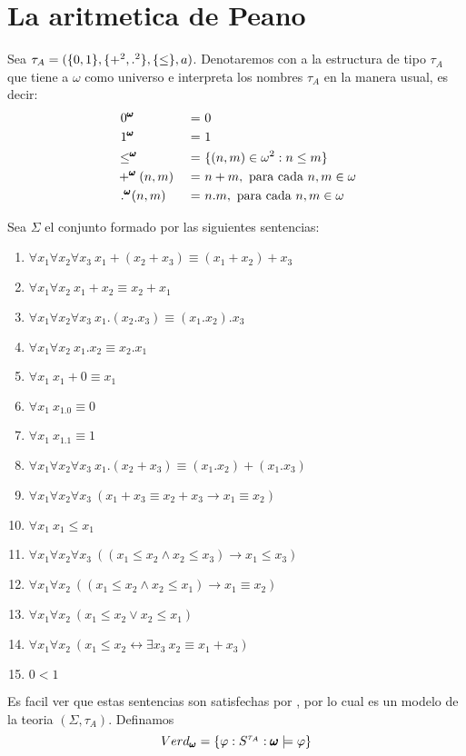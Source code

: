 


\section{La aritmetica de Peano}

\begin{definition}
  Sea $\tau_A = (\{0,1\},\{+^2,.^2\},\{\leq\},a)$. Denotaremos con \pomega a la estructura de tipo $\tau_A$
  que tiene a $\omega$ como universo e interpreta los nombres $\tau_A$ en la manera usual, es decir:
  \begin{alignat*}{4}
    &\ 0^{\pmb{\omega}} &\ =&\ 0\\
    &\ 1^{\pmb{\omega}} &\ =&\ 1\\
    &\leq^{\pmb{\omega}} &\ =&\ \{(n,m)\in \omega^2: n\leq m\}\\
    &+^{\pmb{\omega}}(n,m) &\ =&\ n+m, \text{ para cada } n,m\in\omega\\
    &\ .^{\pmb{\omega}}(n,m) &\ =&\ n.m, \text{ para cada } n,m\in\omega
  \end{alignat*}

  Sea $\Sigma$ el conjunto formado por las siguientes sentencias:\begin{enumerate}
    \item $\forall x_1 \forall x_2 \forall x_3\ x_1+(x_2+x_3)\equiv(x_1+x_2)+x_3$
    \item $\forall x_1 \forall x_2\ x_1+x_2\equiv x_2+x_1$
    \item $\forall x_1 \forall x_2 \forall x_3\ x_1.(x_2.x_3)\equiv(x_1.x_2).x_3$
    \item $\forall x_1 \forall x_2\ x_1.x_2\equiv x_2.x_1$ 
    \item $\forall x_1\ x_1+0\equiv x_1$
    \item $\forall x_1\ x_1.0\equiv 0$
    \item $\forall x_1\ x_1.1\equiv 1$
    \item $\forall x_1 \forall x_2 \forall x_3\ x_1.(x_2+x_3)\equiv(x_1.x_2)+(x_1.x_3)$
    \item $\forall x_1 \forall x_2 \forall x_3\ (x_1+x_3\equiv x_2+x_3\rightarrow x_1\equiv x_2)$
    \item $\forall x_1\ x_1\leq x_1$
    \item $\forall x_1 \forall x_2 \forall x_3\ ((x_1\leq x_2\land x_2\leq x_3)\rightarrow x_1\leq x_3)$
    \item $\forall x_1 \forall x_2\ ((x_1\leq x_2 \land x_2\leq x_1)\rightarrow x_1\equiv x_2)$
    \item $\forall x_1 \forall x_2\ (x_1\leq x_2 \lor x_2\leq x_1)$
    \item $\forall x_1 \forall x_2\ (x_1\leq x_2 \leftrightarrow \exists x_3\ x_2\equiv x_1+x_3)$
    \item $0<1$
  \end{enumerate}

  Es facil ver que estas sentencias son satisfechas por \pomega, por lo cual \pomega es un modelo de la teoria $(\Sigma, \tau_A)$. Definamos
  $$
  Verd_{\pmb{\omega}} = \{\varphi: S^{\tau_A}:\pmb{\omega}\models\varphi\}
  $$

  \end{definition}
